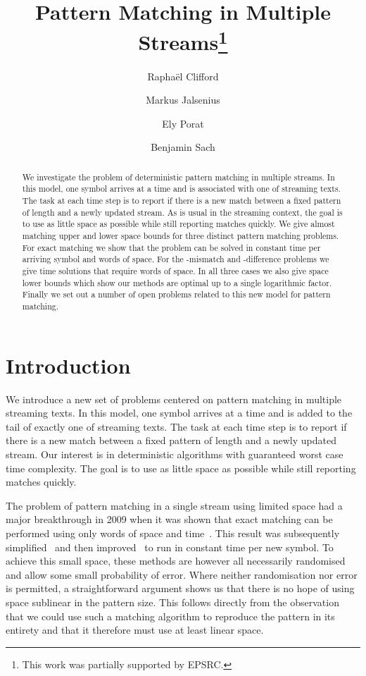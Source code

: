 \documentclass[envcountsame]{llncs}
\title{Pattern Matching in Multiple Streams\footnote{This work was partially supported by EPSRC.}}
\author{
    Rapha\"{e}l Clifford\inst{1} \and
    Markus Jalsenius\inst{1} \and
    Ely Porat\inst{2} \and
    Benjamin Sach\inst{3}}
\institute{
    University of Bristol, Department of Computer Science, Bristol, UK \and
    Bar-Ilan University, Department of Computer Science, Ramat-Gan, Israel \and
    University of Warwick, Department of Computer Science, Coventry, UK}
\begin{document}
\maketitle




\begin{abstract}

    We investigate the problem of deterministic pattern matching in multiple
    streams. In this model, one symbol arrives at a time and is associated with one of 
    streaming texts. The task at each time step is to report if there is a new match between a
    fixed pattern of length  and a newly updated stream.  As is
    usual in the streaming context, the goal is to use as little space
    as possible while still reporting matches quickly.  We
    give almost matching upper and lower space bounds for three distinct
    pattern matching problems.  For exact matching we
    show that the problem can be solved in constant time per arriving symbol and  words of space.  For the
    -mismatch and -difference problems we give  time solutions that require  words of space. In all three cases we also give space lower bounds which show our methods are optimal up to a single logarithmic factor.  Finally we set out a number of open problems related to this new model for pattern matching.
\end{abstract}


\thispagestyle{plain}

\section{Introduction}

We introduce a new set of problems centered on pattern matching in multiple streaming
texts. In this model, one symbol arrives at a time and is added to the tail
of exactly one of  streaming texts.   The task at each time step is to
report if there is a new match between a fixed pattern  of length
 and a newly updated stream.  Our interest is in deterministic
algorithms with guaranteed worst case time complexity.  The goal is to
use as little space as possible while still reporting matches quickly.

The problem of pattern matching in a single stream using limited space had
a major breakthrough in 2009 when it was shown that exact
matching can be performed using only  words of space and
 time~\cite{Porat:09}. This result was subsequently simplified~\cite{EJS:2010}
and then improved~\cite{BG:2011} to run in constant time per new
symbol.   To achieve this small space, these methods are however all
necessarily randomised and allow some small probability of
error. Where neither randomisation nor error is permitted, a
straightforward argument shows us that there is no
hope of using space sublinear in the pattern size.  This follows
directly from the observation that we could use such a matching
algorithm to reproduce the pattern in its entirety and that it
therefore must use at least linear space.
\end{document}

